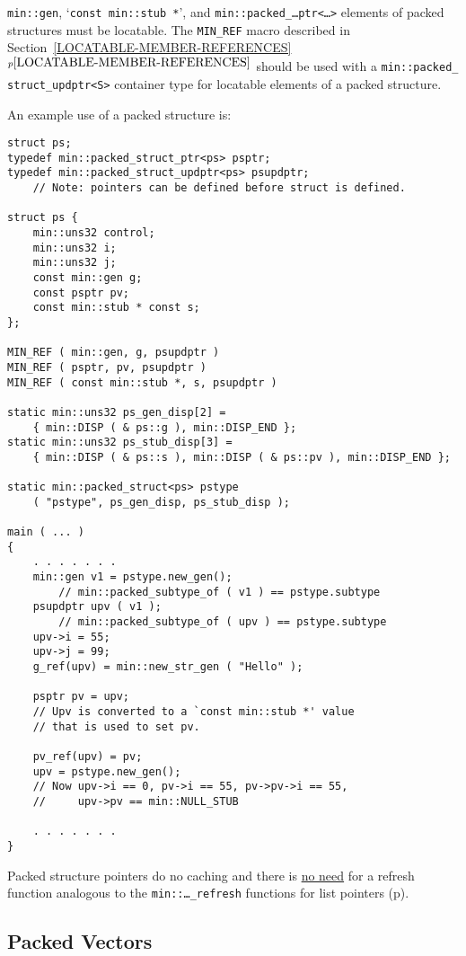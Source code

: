 \documentclass[12pt]{article}
\newcommand{\itemref}[1]{\ref{#1}$^{p\pageref{#1}}$}
\newcommand{\pagref}[1]{p\pageref{#1}}
\newcommand{\EOL}{\penalty \exhyphenpenalty}
\newcommand{\BRACKETED}[1]{{\tt <#1>}}
\newcommand{\SARG}{\BRACKETED{S}}
\newenvironment{indpar}[1][0.3in]%
	{\begin{list}{}%
		     {\setlength{\itemsep}{0in}%
		      \setlength{\topsep}{0in}%
		      \setlength{\parsep}{1ex}%
		      \setlength{\labelwidth}{#1}%
		      \setlength{\leftmargin}{#1}%
		      \addtolength{\leftmargin}{\labelsep}}%
	 \item}%
	{\end{list}}
\begin{document}
{\tt min::gen}, `{\tt const min::stub~*}', and
{\tt min::\EOL packed\_\EOL\ldots ptr\BRACKETED{\ldots}}
elements of packed structures must be locatable.
The {\tt MIN\_REF}\label{PACKED_STRUCT_MIN_REF}
macro described in Section~\itemref{LOCATABLE-MEMBER-REFERENCES}
should be used with a {\tt min::\EOL packed\_\EOL
struct\_\EOL updptr\SARG} container type
for locatable elements of a packed structure.

An example use of a packed structure is:
\begin{indpar}\begin{verbatim}
struct ps;
typedef min::packed_struct_ptr<ps> psptr;
typedef min::packed_struct_updptr<ps> psupdptr;
    // Note: pointers can be defined before struct is defined.

struct ps {
    min::uns32 control;
    min::uns32 i;
    min::uns32 j;
    const min::gen g;
    const psptr pv;
    const min::stub * const s;
};

MIN_REF ( min::gen, g, psupdptr )
MIN_REF ( psptr, pv, psupdptr )
MIN_REF ( const min::stub *, s, psupdptr )

static min::uns32 ps_gen_disp[2] =
    { min::DISP ( & ps::g ), min::DISP_END };
static min::uns32 ps_stub_disp[3] =
    { min::DISP ( & ps::s ), min::DISP ( & ps::pv ), min::DISP_END };

static min::packed_struct<ps> pstype
    ( "pstype", ps_gen_disp, ps_stub_disp );

main ( ... )
{
    . . . . . . .
    min::gen v1 = pstype.new_gen();
        // min::packed_subtype_of ( v1 ) == pstype.subtype
    psupdptr upv ( v1 );
        // min::packed_subtype_of ( upv ) == pstype.subtype
    upv->i = 55;
    upv->j = 99;
    g_ref(upv) = min::new_str_gen ( "Hello" );

    psptr pv = upv;
    // Upv is converted to a `const min::stub *' value
    // that is used to set pv.

    pv_ref(upv) = pv;
    upv = pstype.new_gen();
    // Now upv->i == 0, pv->i == 55, pv->pv->i == 55,
    //     upv->pv == min::NULL_STUB

    . . . . . . .
}
\end{verbatim}\end{indpar}

Packed structure pointers do no caching and
there is \underline{no need} for
a refresh function analogous to the {\tt min::\EOL \ldots\_\EOL refresh}
functions for list pointers (\pagref{LIST-POINTER-CACHE}).

\subsection{Packed Vectors}
\label{PACKED-VECTORS}
\end{document}
